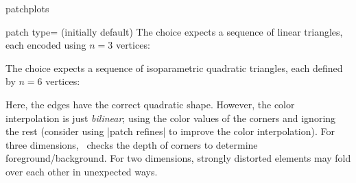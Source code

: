 \begin{pgfplotslibrary}{patchplots}
\begin{pgfplotskey}{patch type= (initially default)}
	The choice  expects a sequence of linear triangles, each encoded using $n=3$ vertices:
\begin{codeexample}[]
\end{codeexample}

	The choice  expects a sequence of isoparametric quadratic triangles, each defined by $n=6$ vertices:
\begin{codeexample}[]
\end{codeexample}
\begin{codeexample}[]
\end{codeexample}
	\noindent Here, the edges have the correct quadratic shape. However, the color interpolation is just \emph{bilinear}; using the color values of the corners and ignoring the rest (consider using |patch refines| to improve the color interpolation). For three dimensions, \PGFPlots\ checks the depth of corners to determine foreground/background. For two dimensions, strongly distorted elements may fold over each other in unexpected ways. 


\end{pgfplotskey}
\end{pgfplotslibrary}
